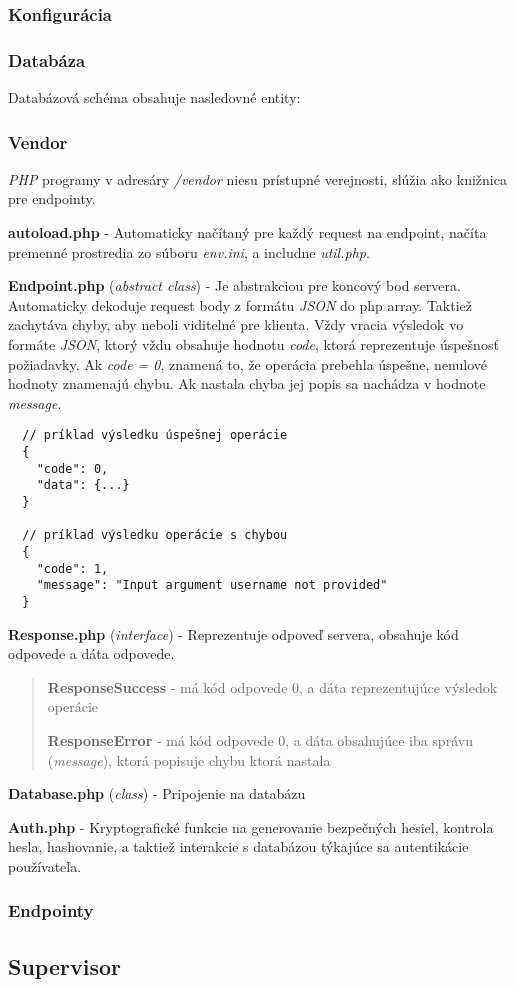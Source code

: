 \documentclass{article}
\begin{document}
\subsubsection{Konfigurácia}

\subsubsection{Databáza}

Databázová schéma obsahuje nasledovné entity:

\subsubsection{Vendor}

\newcommand{\filedesc}[1]{\vspace{0.3cm} \noindent \textbf{#1}}

\emph{PHP} programy v adresáry \emph{/vendor} niesu prístupné verejnosti, slúžia ako knižnica pre endpointy.

\filedesc{autoload.php} - Automaticky načítaný pre každý request na endpoint, načíta premenné prostredia zo súboru \emph{env.ini}, a includne \emph{util.php}.

\filedesc{Endpoint.php} (\emph{abstract class}) - Je abstrakciou pre koncový bod servera. Automaticky dekoduje request body z formátu \emph{JSON} do php array. Taktiež zachytáva chyby, aby neboli viditelné pre klienta. Vždy vracia výsledok vo formáte \emph{JSON}, ktorý vždu obsahuje hodnotu \emph{code}, ktorá reprezentuje úspešnosť požiadavky. Ak \emph{code = 0}, znamená to, že operácia prebehla úspešne, nenulové hodnoty znamenajú chybu. Ak nastala chyba jej popis sa nachádza v hodnote \emph{message}.

\begin{verbatim}
  // príklad výsledku úspešnej operácie
  {
    "code": 0,
    "data": {...}
  }

  // príklad výsledku operácie s chybou
  {
    "code": 1,
    "message": "Input argument username not provided"
  }
\end{verbatim}

\filedesc{Response.php} (\emph{interface}) - Reprezentuje odpoveď servera, obsahuje kód odpovede a dáta odpovede.
\begin{quote}
  \filedesc{ResponseSuccess} - má kód odpovede 0, a dáta reprezentujúce výsledok operácie

  \filedesc{ResponseError} - má kód odpovede 0, a dáta obsahujúce iba správu (\emph{message}), ktorá popisuje chybu ktorá nastala
\end{quote}

\filedesc{Database.php} (\emph{class}) - Pripojenie na databázu

\filedesc{Auth.php} - Kryptografické funkcie na generovanie bezpečných hesiel, kontrola hesla, hashovanie, a taktiež interakcie s databázou týkajúce sa autentikácie používateľa.

\subsubsection{Endpointy}

\subsection{Supervisor}
\end{document}
